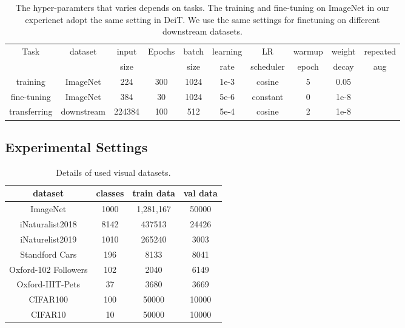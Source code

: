 \documentclass[10pt,twocolumn,letterpaper]{article}
\newcommand{\cmark}{\ding{51}}
\newcommand{\xmark}{\ding{55}}
\begin{document}
\begin{table*}[t]
   \centering
   \small
   \caption{The hyper-paramters that varies depends on tasks. The training and fine-tuning on ImageNet  in our experienet adopt the same setting in DeiT. We use the same settings for finetuning on different downstream datasets.}
   \begin{tabular}{c|c|c|c|c|c|c|c|c|c}
   \toprule
        \multirow{2}{*}{Task} & \multirow{2}{*}{dataset} & input & \multirow{2}{*}{Epochs} & batch & learning & LR & warmup & weight & repeated  \\
        & & size & & size & rate & scheduler & epoch & decay & aug \cite{DBLP:conf/cvpr/HofferBHGHS20} \\
        \midrule
        training & ImageNet & 224 & 300 & 1024 & 1e-3 & cosine & 5  & 0.05 & \cmark \\
        fine-tuning & ImageNet & 384 & 30 & 1024 & 5e-6 & constant & 0 & 1e-8 & \cmark \\
        transferring & downstream & 224384 & 100 & 512 & 5e-4 & cosine & 2 &  1e-8 & \xmark \\
   \bottomrule
   \end{tabular}
   \label{tab:hyper}
\end{table*}

\subsection{Experimental Settings}\label{sec:exp_setting}

\begin{table}[t]
    \centering
    \small
    \caption{Details of used visual datasets.}
    \begin{tabular}{c|ccc}
    \toprule
         dataset & classes & train data & val data  \\
         \midrule
         ImageNet & 1000 & 1,281,167 & 50000 \\
         \midrule
         iNaturalist2018 & 8142 & 437513 & 24426 \\
         iNaturelist2019 & 1010 & 265240 & 3003 \\
         \midrule
         Standford Cars & 196 & 8133 & 8041 \\
         Oxford-102 Followers & 102 & 2040 & 6149 \\
         Oxford-IIIT-Pets & 37 & 3680 & 3669 \\
         \midrule
         CIFAR100 & 100 & 50000 & 10000 \\
         CIFAR10 & 10 & 50000 & 10000 \\
         \bottomrule  
    \end{tabular}
    \label{tab:dataset}
\end{table}
\end{document}
